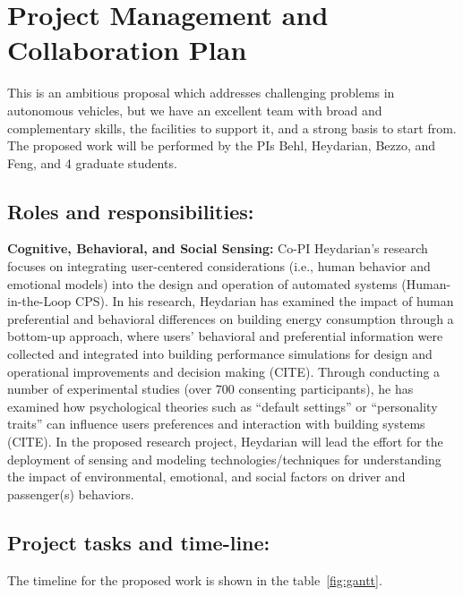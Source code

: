 \section{Project Management and Collaboration Plan}
\label{sec:plan}
This is an ambitious proposal which addresses challenging problems in autonomous vehicles, but we have an excellent team with broad and complementary skills, the facilities to support it, and a strong basis to start from.
The proposed work will be performed by the PIs Behl, Heydarian, Bezzo, and Feng, and 4 graduate students.

\subsection{Roles and responsibilities:}

\textbf{Cognitive, Behavioral, and Social Sensing:} Co-PI Heydarian’s research focuses on integrating user-centered considerations (i.e., human behavior and emotional models) into the design and operation of automated systems (Human-in-the-Loop CPS). In his research, Heydarian has examined the impact of human preferential and behavioral differences on building energy consumption through a bottom-up approach, where users’ behavioral and preferential information were collected and integrated into building performance simulations for design and operational improvements and decision making (CITE). Through conducting a number of experimental studies (over 700 consenting participants), he has examined how psychological theories such as “default settings” or “personality traits” can influence users preferences and interaction with building systems (CITE). In the proposed research project, Heydarian will lead the effort for the deployment of sensing and modeling technologies/techniques for understanding the impact of environmental, emotional, and social factors on driver and passenger(s) behaviors. 




\subsection{Project tasks and time-line:}

The timeline for the proposed work  is shown in the table~\ref{fig:gantt}.

